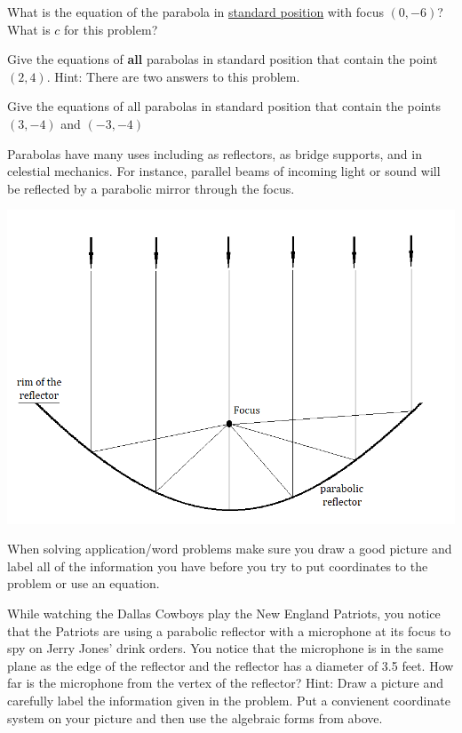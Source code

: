 \question What is the equation of the parabola in \underline{standard position} with focus $(0,-6)$? What is $c$ for this problem?

\question Give the equations of \textbf{all} parabolas in standard position that contain the point $(2,4)$. Hint: There are two answers to this problem.

\question Give the equations of all parabolas in standard position that contain the points $(3,-4)$ and $(-3,-4)$

\begin{info} Parabolas have many uses including as reflectors, as bridge supports, and in celestial mechanics. For instance, parallel beams of incoming light or sound will be reflected by a parabolic mirror through the focus.

\begin{center} \includegraphics[scale=.4]{parabolic-reflector2.png} \end{center}

When solving application/word problems make sure you draw a good picture and label all of the information you have before you try to put coordinates to the problem or use an equation.
\end{info}

\question While watching the Dallas Cowboys play the New England Patriots, you notice that the Patriots are using a parabolic reflector with a microphone at its focus to spy on Jerry Jones' drink orders. You notice that the microphone is in the same plane as the edge of the reflector and the reflector has a diameter of 3.5 feet. How far is the microphone from the vertex of the reflector? Hint: Draw a picture and carefully label the information given in the problem. Put a convienent coordinate system on your picture and then use the algebraic forms from above.

